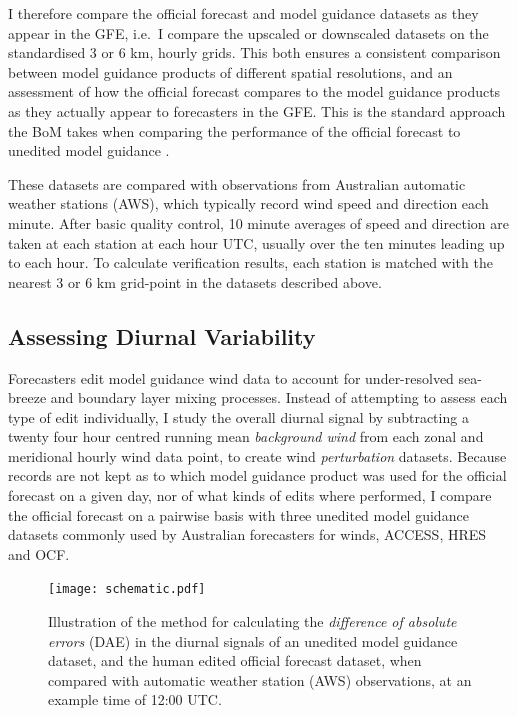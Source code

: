\documentclass{ametsoc}
\begin{document}
I therefore compare the official forecast and model guidance datasets as they appear in the GFE, i.e.~I compare the upscaled or downscaled datasets on the standardised 3 or 6 km, hourly grids. This both ensures a consistent comparison between model guidance products of different spatial resolutions, and an assessment of how the official forecast compares to the model guidance products as they actually appear to forecasters in the GFE. This is the standard approach the BoM takes when comparing the performance of the official forecast to unedited model guidance \citep[e.g.][]{griffiths17}.

These datasets are compared with observations from Australian automatic weather stations (AWS), which typically record wind speed and direction each minute. After basic quality control, 10 minute averages of speed and direction are taken at each station at each hour UTC, usually over the ten minutes leading up to each hour. To calculate verification results, each station is matched with the nearest 3 or 6 km grid-point in the datasets described above.

\subsection{Assessing Diurnal Variability}
Forecasters edit model guidance wind data to account for under-resolved sea-breeze and boundary layer mixing processes. Instead of attempting to assess each type of edit individually, I study the overall diurnal signal by subtracting a twenty four hour centred running mean \textit{background wind} from each zonal and meridional hourly wind data point, to create wind \emph{perturbation} datasets. Because records are not kept as to which model guidance product was used for the official forecast on a given day, nor of what kinds of edits where performed, I compare the official forecast on a pairwise basis with three unedited model guidance datasets commonly used by Australian forecasters for winds, ACCESS, HRES and OCF.

\begin{figure}
\centering
\texttt{[image: schematic.pdf]}
\caption{Illustration of the method for calculating the \textit{difference of absolute errors} (DAE) in the diurnal signals of an unedited model guidance dataset, and the human edited official forecast dataset, when compared with automatic weather station (AWS) observations, at an example time of 12:00 UTC.}
\label{Fig:schematic}
\end{figure}
\end{document}
